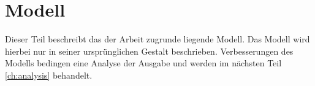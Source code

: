 \chapter{Modell}
\label{ch:model}

Dieser Teil beschreibt das der Arbeit zugrunde liegende Modell.
Das Modell wird hierbei nur in seiner ursprünglichen Gestalt beschrieben.
Verbesserungen des Modells bedingen eine Analyse der Ausgabe und werden im nächsten Teil \ref{ch:analysis} behandelt.




